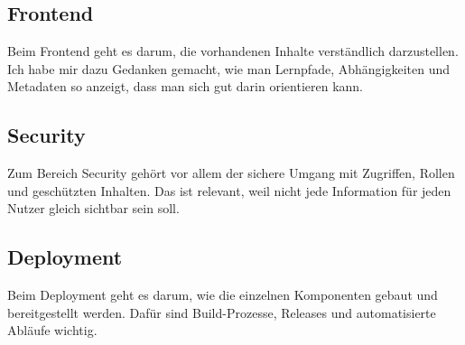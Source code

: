 \subsection{Frontend}

Beim Frontend geht es darum, die vorhandenen Inhalte verständlich darzustellen. Ich habe mir dazu Gedanken gemacht, wie man Lernpfade, Abhängigkeiten und Metadaten so anzeigt, dass man sich gut darin orientieren kann.

\subsection{Security}

Zum Bereich Security gehört vor allem der sichere Umgang mit Zugriffen, Rollen und geschützten Inhalten. Das ist relevant, weil nicht jede Information für jeden Nutzer gleich sichtbar sein soll.

\subsection{Deployment}

Beim Deployment geht es darum, wie die einzelnen Komponenten gebaut und bereitgestellt werden. Dafür sind Build-Prozesse, Releases und automatisierte Abläufe wichtig.